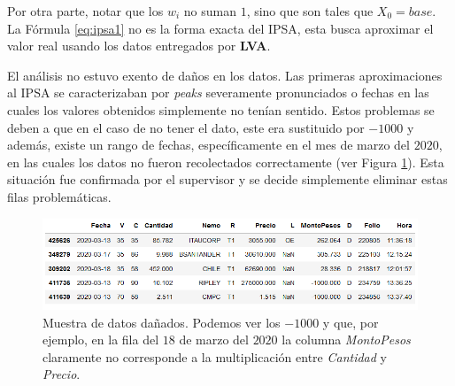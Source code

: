 \documentclass{article}
\begin{document}
   Por otra parte, notar que los  $w_i$ no suman $1$, sino que son tales que $X_0=base$. La Fórmula \ref{eq:ipsa1} no es la forma exacta del IPSA, esta busca aproximar el valor real usando los datos entregados por \textbf{LVA}.
   	\begin{remark}
   		El análisis no estuvo exento de daños en los datos. Las primeras aproximaciones al IPSA se caracterizaban por \textit{peaks} severamente pronunciados o fechas en las cuales los valores obtenidos simplemente no tenían sentido. Estos problemas se deben a que en el caso de no tener el dato, este era sustituido por $-1000$ y además, existe un rango de fechas, específicamente en el mes de marzo del $2020$, en las cuales los datos no fueron recolectados correctamente (ver Figura \ref{fig:danados}). Esta situación fue confirmada por el supervisor y se decide simplemente eliminar estas filas problemáticas. 
   		
   		\begin{figure}[H]
   			\centering
   			\includegraphics[scale=.5]{imgs/muestra_danada.png}
   			\caption{Muestra de datos dañados. Podemos ver los $-1000$ y que, por ejemplo, en la fila del $18$ de marzo del $2020$ la columna \textit{MontoPesos} claramente no corresponde a la multiplicación entre \textit{Cantidad} y \textit{Precio}.}
   			\label{fig:danados}
   		\end{figure}
   		
   	\end{remark}
   	
\end{document}

